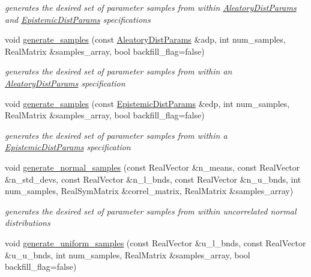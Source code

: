 \begin{DoxyCompactItemize}
\begin{DoxyCompactList}\small\item\em generates the desired set of parameter samples from within \hyperlink{classPecos_1_1AleatoryDistParams}{Aleatory\+Dist\+Params} and \hyperlink{classPecos_1_1EpistemicDistParams}{Epistemic\+Dist\+Params} specifications \end{DoxyCompactList}\item 
void \hyperlink{classPecos_1_1LHSDriver_ac603c16fc0c6da159f0f2188071fd10f}{generate\+\_\+samples} (const \hyperlink{classPecos_1_1AleatoryDistParams}{Aleatory\+Dist\+Params} \&adp, int num\+\_\+samples, Real\+Matrix \&samples\+\_\+array, bool backfill\+\_\+flag=false)\label{classPecos_1_1LHSDriver_ac603c16fc0c6da159f0f2188071fd10f}

\begin{DoxyCompactList}\small\item\em generates the desired set of parameter samples from within an \hyperlink{classPecos_1_1AleatoryDistParams}{Aleatory\+Dist\+Params} specification \end{DoxyCompactList}\item 
void \hyperlink{classPecos_1_1LHSDriver_a1ea01ac381f57675a33c1330ba48dfa8}{generate\+\_\+samples} (const \hyperlink{classPecos_1_1EpistemicDistParams}{Epistemic\+Dist\+Params} \&edp, int num\+\_\+samples, Real\+Matrix \&samples\+\_\+array, bool backfill\+\_\+flag=false)\label{classPecos_1_1LHSDriver_a1ea01ac381f57675a33c1330ba48dfa8}

\begin{DoxyCompactList}\small\item\em generates the desired set of parameter samples from within a \hyperlink{classPecos_1_1EpistemicDistParams}{Epistemic\+Dist\+Params} specification \end{DoxyCompactList}\item 
void \hyperlink{classPecos_1_1LHSDriver_a3a7e4173b0731e7dcd12828f7cae7732}{generate\+\_\+normal\+\_\+samples} (const Real\+Vector \&n\+\_\+means, const Real\+Vector \&n\+\_\+std\+\_\+devs, const Real\+Vector \&n\+\_\+l\+\_\+bnds, const Real\+Vector \&n\+\_\+u\+\_\+bnds, int num\+\_\+samples, Real\+Sym\+Matrix \&correl\+\_\+matrix, Real\+Matrix \&samples\+\_\+array)\label{classPecos_1_1LHSDriver_a3a7e4173b0731e7dcd12828f7cae7732}

\begin{DoxyCompactList}\small\item\em generates the desired set of parameter samples from within uncorrelated normal distributions \end{DoxyCompactList}\item 
void \hyperlink{classPecos_1_1LHSDriver_ae7a28d8e09d882572dc9d86b1afe5d5f}{generate\+\_\+uniform\+\_\+samples} (const Real\+Vector \&u\+\_\+l\+\_\+bnds, const Real\+Vector \&u\+\_\+u\+\_\+bnds, int num\+\_\+samples, Real\+Matrix \&samples\+\_\+array, bool backfill\+\_\+flag=false)\label{classPecos_1_1LHSDriver_ae7a28d8e09d882572dc9d86b1afe5d5f}


\end{DoxyCompactItemize}
